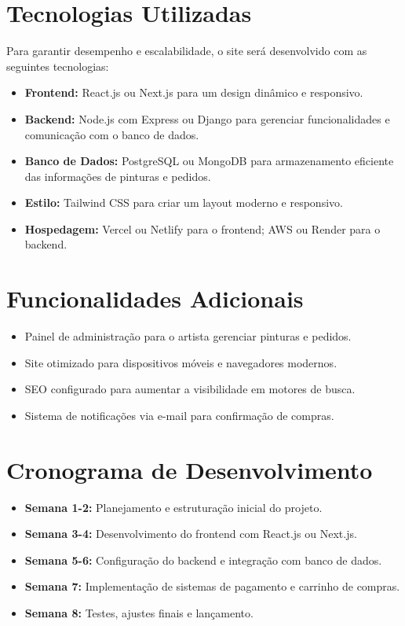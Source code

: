 \documentclass[a4paper,12pt]{article}
\begin{document}
\section*{Tecnologias Utilizadas}
Para garantir desempenho e escalabilidade, o site será desenvolvido com as seguintes tecnologias:
\begin{itemize}
    \item \textbf{Frontend:} React.js ou Next.js para um design dinâmico e responsivo.
    \item \textbf{Backend:} Node.js com Express ou Django para gerenciar funcionalidades e comunicação com o banco de dados.
    \item \textbf{Banco de Dados:} PostgreSQL ou MongoDB para armazenamento eficiente das informações de pinturas e pedidos.
    \item \textbf{Estilo:} Tailwind CSS para criar um layout moderno e responsivo.
    \item \textbf{Hospedagem:} Vercel ou Netlify para o frontend; AWS ou Render para o backend.
\end{itemize}

\section*{Funcionalidades Adicionais}
\begin{itemize}
    \item Painel de administração para o artista gerenciar pinturas e pedidos.
    \item Site otimizado para dispositivos móveis e navegadores modernos.
    \item SEO configurado para aumentar a visibilidade em motores de busca.
    \item Sistema de notificações via e-mail para confirmação de compras.
\end{itemize}

\section*{Cronograma de Desenvolvimento}
\begin{itemize}
    \item \textbf{Semana 1-2:} Planejamento e estruturação inicial do projeto.
    \item \textbf{Semana 3-4:} Desenvolvimento do frontend com React.js ou Next.js.
    \item \textbf{Semana 5-6:} Configuração do backend e integração com banco de dados.
    \item \textbf{Semana 7:} Implementação de sistemas de pagamento e carrinho de compras.
    \item \textbf{Semana 8:} Testes, ajustes finais e lançamento.
\end{itemize}
\end{document}
